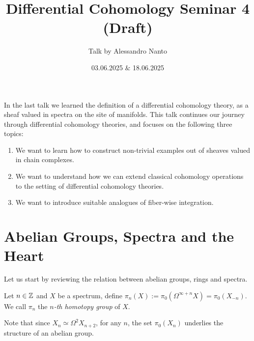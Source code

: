 \documentclass[10pt]{amsart}
\title{Differential Cohomology Seminar 4 (Draft)}
\date{03.06.2025 $\&$ 18.06.2025}
\author{Talk by Alessandro Nanto}
\begin{document}
\maketitle

In the last talk we learned the definition of a differential cohomology theory, as a sheaf valued in spectra on the site of manifolds. This talk continues our journey through differential cohomology theories, and focuses on the following three topics:
\begin{enumerate}
  \item We want to learn how to construct non-trivial examples out of sheaves valued in chain complexes.
  \item We want to understand how we can extend classical cohomology operations to the setting of differential cohomology theories.
  \item We want to introduce suitable analogues of fiber-wise integration.  
\end{enumerate}

\section{Abelian Groups, Spectra and the Heart}
Let us start by reviewing the relation between abelian groups, rings and spectra. 
\begin{definition}
    Let $n\in\mathbb{Z}$ and $X$ be a spectrum, define $\pi_n(X):=\pi_0(\Omega^{\infty+n}X)=\pi_0(X_{-n})$. We call $\pi_n$ the \textit{$n$-th homotopy group} of $X$. 
\end{definition}
\begin{remark}
 Note that since $X_n\simeq\Omega^2X_{n+2}$, for any $n$, the set $\pi_0(X_n)$ underlies the structure of an abelian group.
\end{remark}
\end{document}
